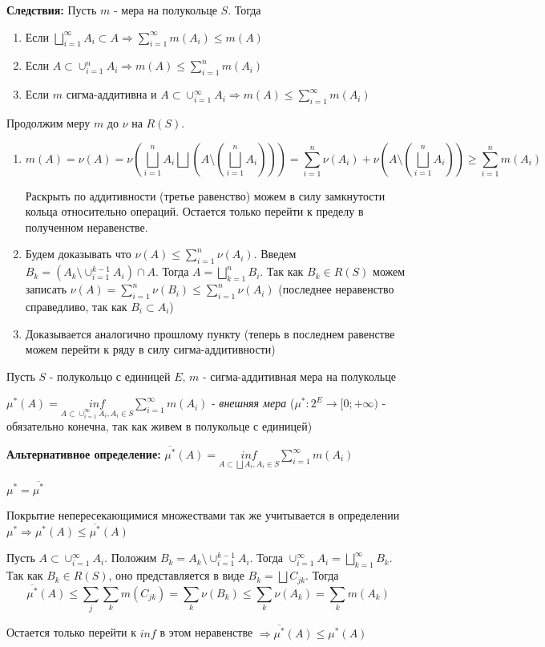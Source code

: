 \par \textbf{Следствия:} Пусть $m$ - мера на полукольце $S$. Тогда
\begin{enumerate}
    \item Если $\bigsqcup_{i=1}^\infty A_i \subset A \Rightarrow \sum_{i=1}^\infty m(A_i) \leq m(A)$
    \item Если $A \subset \cup_{i=1}^n A_i \Rightarrow m(A) \leq \sum_{i=1}^n m(A_i)$
    \item Если $m$ сигма-аддитивна и $A \subset \cup_{i=1}^\infty A_i \Rightarrow m(A) \leq \sum_{i=1}^\infty m(A_i)$
\end{enumerate}
\par \Proof Продолжим меру $m$ до $\nu$ на $R(S)$. \begin{enumerate}
    \item $$m(A)=\nu(A)=\nu(\bigsqcup_{i=1}^n A_i \bigsqcup (A \setminus (\bigsqcup_{i=1}^n A_i)))=\sum_{i=1}^n \nu(A_i) + \nu(A \setminus (\bigsqcup_{i=1}^n A_i)) \geq \sum_{i=1}^n m(A_i)$$
    \par Раскрыть по аддитивности (третье равенство) можем в силу замкнутости кольца относительно операций. Остается только перейти к пределу в полученном неравенстве.
    \item Будем доказывать что $\nu(A) \leq \sum_{i=1}^n \nu(A_i)$. Введем $B_k=(A_k \setminus \cup_{i=1}^{k-1} A_i) \cap A$. Тогда $A=\bigsqcup_{k=1}^n B_i$. Так как $B_k \in R(S)$ можем записать $\nu(A)=\sum_{i=1}^n \nu(B_i) \leq \sum_{i=1}^n \nu(A_i)$ (последнее неравенство справедливо, так как $B_i \subset A_i$)
    \item Доказывается аналогично прошлому пункту (теперь в последнем равенстве можем перейти к ряду в силу сигма-аддитивности) \EndProof
\end{enumerate}
\par Пусть $S$ - полукольцо с единицей $E$, $m$ - сигма-аддитивная мера на полукольце

\par \Def $\mu^*(A)=\underset{A\subset \cup_{i=1}^\infty A_i, A_i \in S}{inf}\sum_{i=1}^\infty m(A_i)$ - \textit{внешняя мера} ($\mu^*: 2^E \rightarrow [0;+\infty)$ - обязательно конечна, так как живем в полукольце с единицей)

\leftbar
\par \textbf{Альтернативное определение:} $\overline{\mu^*}(A)=\underset{A \subset \bigsqcup A_i, A_i \in S}{inf} \sum_{i=1}^\infty m(A_i)$

\par \Statement $\mu^*=\overline{\mu^*}$
\par \Proof Покрытие непересекающимися множествами так же учитывается в определении $\mu^* \Rightarrow \mu^*(A) \leq \overline{\mu^*}(A)$
\par Пусть $A \subset \cup_{i=1}^\infty A_i$. Положим $B_k=A_k \setminus \cup_{i=1}^{k-1}A_i$. Тогда $\cup_{i=1}^\infty A_i=\bigsqcup_{k=1}^\infty B_k$. Так как $B_k \in R(S)$, оно представляется в виде $B_k=\bigsqcup C_{jk}$. Тогда $$\overline{\mu^*}(A) \leq \sum_j \sum_k m(C_{jk})=\sum_k \nu(B_k) \leq \sum_k \nu(A_k)=\sum_k m(A_k)$$
\par Остается только перейти к $inf$ в этом неравенстве $\Rightarrow \overline{\mu^*}(A) \leq \mu^*(A)$
\endleftbar

